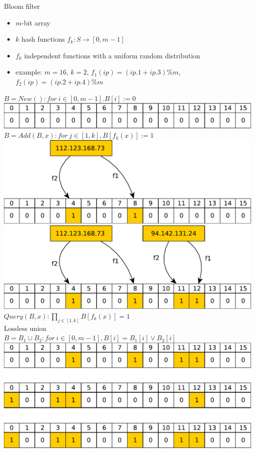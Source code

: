 \documentclass{beamer}
\begin{document}
\begin{frame}[t]{Bloom filter}
  \begin{itemize}
  \item $m$-bit array
  \item $k$ hash functions $f_k : S \rightarrow [0, m-1]$
  \item $f_k$ independent functions with a uniform random distribution
  \item example: $m = 16$, $k=2$, $f_1(ip) = (ip.1+ip.3) \% m$,
    $f_2(ip) = (ip.2+ip.4) \% m$
  \end{itemize}
   {
  $B = New() : for\  i \in [0, m-1]. B[i] := 0$\\
  \includegraphics[width=0.8\linewidth]{bloom0}
  }
   {
  $B = Add(B, x): for\ j \in [1,k], B[f_k(x)] := 1$\\
  }
   {
  \includegraphics[width=0.8\linewidth]{bloom1}
  }
   {
  \includegraphics[width=0.8\linewidth]{bloom2}
  }
   {
  $Query(B, x): \prod_{j \in [1,k]} B[f_k(x)] = 1$\\
  }
   {
  Lossless union\\
  $B = B_1 \cup B_2: for\ i \in [0,m-1], B[i] = B_1[i] \vee B_2[i]$\\
  \includegraphics[width=0.8\linewidth]{bloom3}
}
\end{frame}
\end{document}

